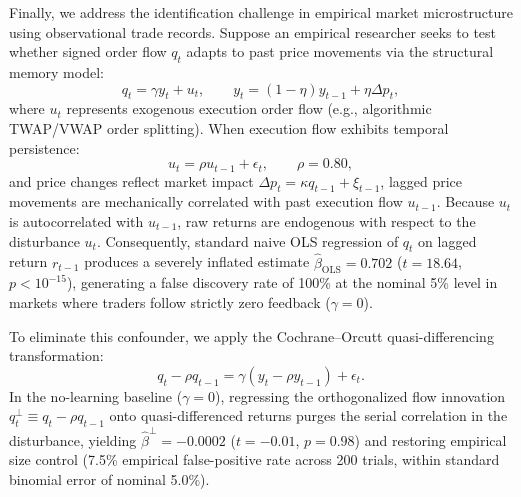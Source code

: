 \documentclass[12pt]{article}
\theoremstyle{definition}
\theoremstyle{remark}
\begin{document}
Finally, we address the identification challenge in empirical market microstructure using observational trade records. Suppose an empirical researcher seeks to test whether signed order flow $q_t$ adapts to past price movements via the structural memory model:
\begin{equation}
q_t = \gamma y_t + u_t, \qquad y_t = (1 - \eta) y_{t-1} + \eta \Delta p_t,
\end{equation}
where $u_t$ represents exogenous execution order flow (e.g., algorithmic TWAP/VWAP order splitting). When execution flow exhibits temporal persistence:
\begin{equation}
u_t = \rho u_{t-1} + \epsilon_t, \qquad \rho = 0.80,
\end{equation}
and price changes reflect market impact $\Delta p_t = \kappa q_{t-1} + \xi_{t-1}$, lagged price movements are mechanically correlated with past execution flow $u_{t-1}$. Because $u_t$ is autocorrelated with $u_{t-1}$, raw returns are endogenous with respect to the disturbance $u_t$. Consequently, standard naive OLS regression of $q_t$ on lagged return $r_{t-1}$ produces a severely inflated estimate $\hat{\beta}_{\mathrm{OLS}} = 0.702$ ($t = 18.64$, $p < 10^{-15}$), generating a false discovery rate of 100\% at the nominal 5\% level in markets where traders follow strictly zero feedback ($\gamma = 0$).

To eliminate this confounder, we apply the Cochrane--Orcutt quasi-differencing transformation:
\begin{equation}
q_t - \rho q_{t-1} = \gamma (y_t - \rho y_{t-1}) + \epsilon_t.
\end{equation}
In the no-learning baseline ($\gamma = 0$), regressing the orthogonalized flow innovation $q_t^\perp \equiv q_t - \rho q_{t-1}$ onto quasi-differenced returns purges the serial correlation in the disturbance, yielding $\hat{\beta}^\perp = -0.0002$ ($t = -0.01$, $p = 0.98$) and restoring empirical size control (7.5\% empirical false-positive rate across 200 trials, within standard binomial error of nominal 5.0\%).
\end{document}
